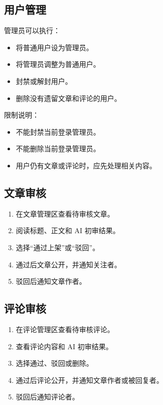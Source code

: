 \documentclass[UTF8,a4paper,12pt]{ctexart}
\begin{document}
\subsection{用户管理}

管理员可以执行：

\begin{itemize}
  \item 将普通用户设为管理员。
  \item 将管理员调整为普通用户。
  \item 封禁或解封用户。
  \item 删除没有遗留文章和评论的用户。
\end{itemize}

限制说明：

\begin{itemize}
  \item 不能封禁当前登录管理员。
  \item 不能删除当前登录管理员。
  \item 用户仍有文章或评论时，应先处理相关内容。
\end{itemize}

\subsection{文章审核}

\begin{enumerate}
  \item 在文章管理区查看待审核文章。
  \item 阅读标题、正文和 AI 初审结果。
  \item 选择“通过上架”或“驳回”。
  \item 通过后文章公开，并通知关注者。
  \item 驳回后通知文章作者。
\end{enumerate}

\subsection{评论审核}

\begin{enumerate}
  \item 在评论管理区查看待审核评论。
  \item 查看评论内容和 AI 初审结果。
  \item 选择通过、驳回或删除。
  \item 通过后评论公开，并通知文章作者或被回复者。
  \item 驳回后通知评论者。
\end{enumerate}
\end{document}
